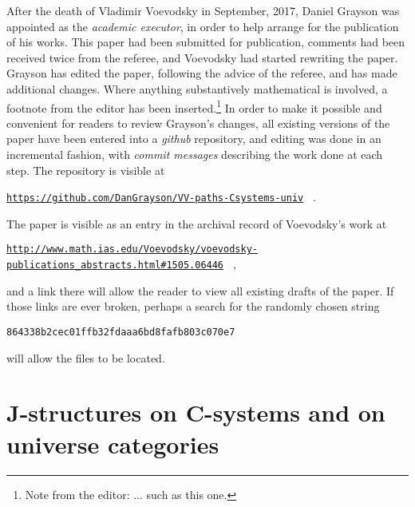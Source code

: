 \documentclass[12pt]{article}
\numberwithin{equation}{section}
\begin{document}
\newcommand{\editorfootnote}[1]{\footnote{Note from the editor: #1}}

After the death of Vladimir Voevodsky in September, 2017, Daniel Grayson was
appointed as the {\em academic executor}, in order to help arrange for the
publication of his works.  This paper had been submitted for publication,
comments had been received twice from the referee, and Voevodsky had started
rewriting the paper.
Grayson has edited the paper, following the advice of the referee, and has made
additional changes.  Where anything substantively mathematical is
involved, a footnote from the editor has been inserted.\editorfootnote{... such
  as this one.}
In order to make it possible and convenient for readers to review Grayson's
changes, all existing versions of the paper have been entered into a {\em github}
repository, and editing was done in an incremental fashion, with {\em commit
  messages} describing the work done at each step.  The repository is visible
at
\hfill\break\centerline{\tiny{\tt \href{https://github.com/DanGrayson/VV-paths-Csystems-univ}{https://github.com/DanGrayson/VV-paths-Csystems-univ}%
  } .}
The paper is visible as an entry in the archival record of Voevodsky's work at
\hfill\break\centerline{\tiny{\tt \href{http://www.math.ias.edu/Voevodsky/voevodsky-publications\_abstracts.html\#1505.06446}{http://www.math.ias.edu/Voevodsky/voevodsky-publications\_abstracts.html\#1505.06446}%
  } ,}
and a link there will allow the reader to view all existing drafts of the paper.
If those links are ever broken, perhaps a search for the randomly chosen string
\hfill\break\centerline{{\tt 864338b2cec01ffb32fdaaa6bd8fafb803c070e7}}
will allow the files to be located.

\section{J-structures on C-systems and on universe categories}
\end{document}
